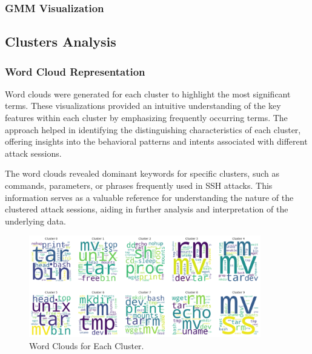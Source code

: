         

        \subsubsection{GMM Visualization \\}

        

    \subsection{Clusters Analysis}

        \subsubsection{Word Cloud Representation \\}

        Word clouds were generated for each cluster to highlight the most significant terms. These visualizations provided an intuitive understanding of the key features within each cluster by emphasizing frequently occurring terms. The approach helped in identifying the distinguishing characteristics of each cluster, offering insights into the behavioral patterns and intents associated with different attack sessions.

        The word clouds revealed dominant keywords for specific clusters, such as commands, parameters, or phrases frequently used in SSH attacks. This information serves as a valuable reference for understanding the nature of the clustered attack sessions, aiding in further analysis and interpretation of the underlying data.


            \begin{figure}[H]
                \centering
                \includegraphics[width=0.9\textwidth]{../figures/plots/section3/circular_wordclouds.png}
                \caption{Word Clouds for Each Cluster.}
                \label{fig:word_clouds}
            \end{figure}


